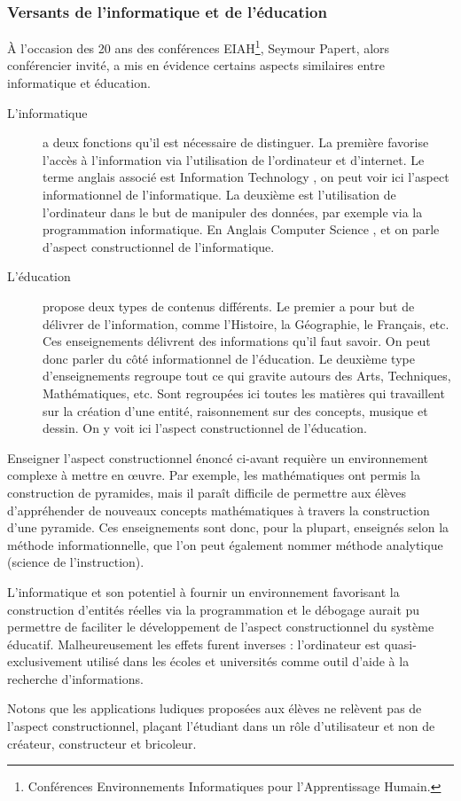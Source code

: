\subsubsection{Versants de l'informatique et de l'éducation}
À l'occasion des 20 ans des conférences EIAH\footnote{Conférences Environnements Informatiques pour l'Apprentissage Humain.}, Seymour Papert, alors conférencier invité, a mis en évidence certains aspects similaires entre informatique et éducation\cite{interview_papert}.

\begin{description}
  \item[L'informatique] a deux fonctions qu'il est nécessaire de distinguer. La première favorise l'accès à l'information via l'utilisation de l'ordinateur et d'internet. Le terme anglais associé est \og Information Technology \fg{}, on peut voir ici l'aspect informationnel de l'informatique. La deuxième est l'utilisation de l'ordinateur dans le but de manipuler des données, par exemple via la programmation informatique. En Anglais \og Computer Science \fg{}, et on parle d'aspect constructionnel de l'informatique.
  \item[L'éducation] propose deux types de contenus différents. Le premier a pour but de délivrer de l'information, comme l'Histoire, la Géographie, le Français, etc. Ces enseignements délivrent des informations qu'il faut savoir. On peut donc parler du côté informationnel de l'éducation. Le deuxième type d'enseignements regroupe tout ce qui gravite autours des Arts, Techniques, Mathématiques, etc. Sont regroupées ici toutes les matières qui travaillent sur la création d'une entité, raisonnement sur des concepts, musique et dessin. On y voit ici l'aspect constructionnel de l'éducation.
\end{description}

Enseigner l'aspect constructionnel énoncé ci-avant requière un environnement complexe à mettre en œuvre. Par exemple, les mathématiques ont permis la construction de pyramides, mais il paraît difficile de permettre aux élèves d’appréhender de nouveaux concepts mathématiques à travers la construction d'une pyramide. Ces enseignements sont donc, pour la plupart, enseignés selon la méthode informationnelle, que l'on peut également nommer méthode analytique (science de l'instruction).

L'informatique et son potentiel à fournir un environnement favorisant la construction d'entités réelles via la programmation et le débogage aurait pu permettre de faciliter le développement de l'aspect constructionnel du système éducatif. Malheureusement les effets furent inverses : l'ordinateur est quasi-exclusivement utilisé dans les écoles et universités comme outil d'aide à la recherche d'informations.

Notons que les applications \og ludiques \fg{} proposées aux élèves ne relèvent pas de l'aspect constructionnel, plaçant l'étudiant dans un rôle d'utilisateur et non de créateur, constructeur et bricoleur.